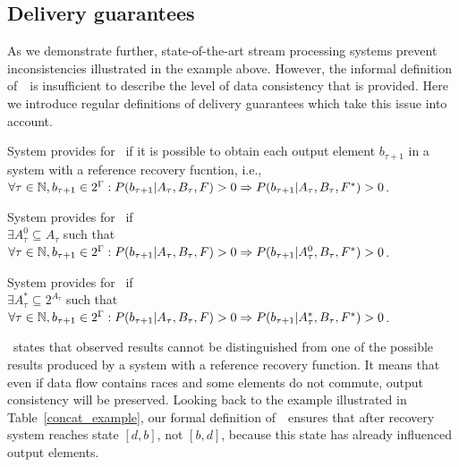 
\subsection{Delivery guarantees}

As we demonstrate further, state-of-the-art stream processing systems prevent inconsistencies illustrated in the example above. However, the informal definition of~\eo\ is insufficient to describe the level of data consistency that is provided. Here we introduce regular definitions of delivery guarantees which take this issue into account. 

\begin{definition}{System provides for~\eo}
if it is possible to obtain each output element $b_{\tau+1}$ in a system with a reference recovery fucntion, i.e.,\\ 
$\forall{\tau \in \mathbb{N}}, b_{\tau+1}\in 2^{\Gamma}: P(b_{\tau+1}|A_{\tau},B_\tau,F)>0 \Rightarrow \\ P(b_{\tau+1}|A_{\tau},B_\tau,F^{*})>0$.
\end{definition}

\begin{definition}{System provides for~\amo}
if \\
$\exists{A^{0}_{\tau}\subseteq{A_{\tau}}}$ such that \\
$\forall{\tau \in \mathbb{N},{b_{\tau+1}\in 2^{\Gamma}}}: P(b_{\tau+1}|A_{\tau},B_\tau,F)>0 \Rightarrow \\ P(b_{\tau+1}|A^{0}_{\tau},B_\tau,F^{*})>0$.
\end{definition}

\begin{definition}{System provides for~\alo}
if \\
$\exists{A^{*}_{\tau}\subseteq{2^{A_{\tau}}}}$ such that \\
$\forall{\tau \in \mathbb{N}, {b_{\tau+1} \in 2^{\Gamma}}}: P(b_{\tau+1}|A_{\tau},B_\tau,F)>0 \Rightarrow \\ P(b_{\tau+1}|A^{*}_{\tau},B_\tau,F^{*})>0$.
\end{definition}

\Eo\ states that observed results cannot be distinguished from one of the possible results produced by a system with a reference recovery function. It means that even if data flow contains races and some elements do not commute, output consistency will be preserved. Looking back to the example illustrated in Table~\ref{concat_example}, our formal definition of~\eo\ ensures that after recovery system reaches state $[d,b]$, not $[b,d]$, because this state has already influenced output elements.

